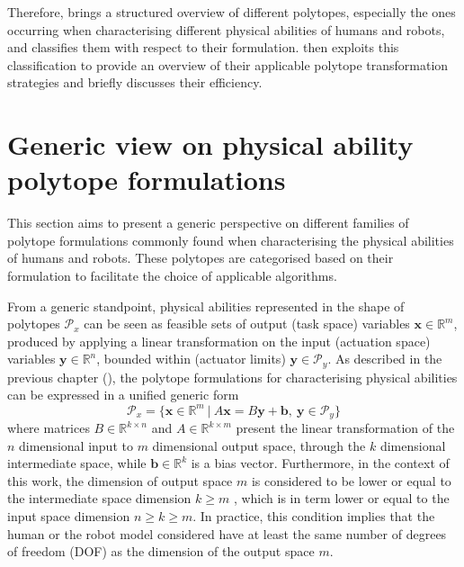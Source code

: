 Therefore,  brings a structured overview of different polytopes, especially the ones occurring when characterising different physical abilities of humans and robots, and classifies them with respect to their formulation.  then exploits this classification to provide an overview of their applicable polytope transformation strategies and briefly discusses their efficiency.

\section{Generic view on physical ability polytope formulations}
\label{ch:generic_view}

This section aims to present a generic perspective on different families of polytope formulations commonly found when characterising the physical abilities of humans and robots. These polytopes are categorised based on their formulation to facilitate the choice of applicable algorithms.

From a generic standpoint, physical abilities represented in the shape of polytopes $\mathcal{P}_x$ can be seen as feasible sets of output (task space) variables $\bm{x} \in \mathbb{R}^m$, produced by applying a linear transformation on the input (actuation space) variables $\bm{y} \in \mathbb{R}^n$, bounded within (actuator limits) $\bm{y}\in\mathcal{P}_y$. As described in the previous chapter (), the polytope formulations for characterising physical abilities can be expressed in a unified generic form 
\begin{equation}
    \mathcal{P}_x = \{\bm{x}\in\mathbb{R}^m ~|~ A\bm{x}=B\bm{y} + \bm{b}, ~ \bm{y}\in\mathcal{P}_y\}
    \label{eq:generic_polyt_view_revisit}
\end{equation}
where matrices $B\in\mathbb{R}^{k\times n}$ and $A\in\mathbb{R}^{k\times m}$ present the linear transformation of the $n$ dimensional input to $m$ dimensional output space, through the $k$ dimensional intermediate space, while $\bm{b}\in\mathbb{R}^k$ is a bias vector. Furthermore, in the context of this work, the dimension of output space $m$ is considered to be lower or equal to the intermediate space dimension $k\!\geq\! m$ , which is in term lower or equal to the input space dimension $n\!\geq\! k\!\geq\! m$. In practice, this condition implies that the human or the robot model considered have at least the same number of degrees of freedom (DOF) as the dimension of the output space $m$. 

